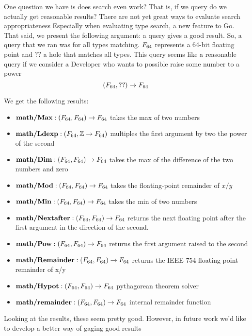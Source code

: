 One question we have is does search even work?
That is, if we query do we actually get reasonable results?
There are not yet great ways to evaluate search appropriateness
Especially when evaluating type search, a new feature to Go.
That said, we present the following argument:
a query gives a good result.
So, a query that we ran was for all types matching.
$F_{64}$ represents a 64-bit floating point and $??$
a hole that matches all types.
This query seems like a reasonable query if we consider a Developer who wants 
to possible raise some number to a power
$$(F_{64}, ??) \to F_{64}$$

We get the following results:
\begin{itemize}
    \item $\textbf{math/Max} : (F_{64}, F_{64}) \to F_{64}$ takes the max of two numbers  \\
    \item $\textbf{math/Ldexp} : (F_{64}, \mathbb{Z} \to F_{64})$ multiples the first argument by two the power of the second   \\
    \item $\textbf{math/Dim} : (F_{64}, F_{64}) \to F_{64}$ takes the max of the difference of the two numbers and zero  \\
    \item $\textbf{math/Mod} : (F_{64}, F_{64}) \to F_{64}$ takes the floating-point remainder of $x/y$ \\
    \item $\textbf{math/Min} : (F_{64}, F_{64}) \to F_{64}$ takes the min of two numbers  \\
    \item $\textbf{math/Nextafter} : (F_{64}, F_{64}) \to F_{64}$ returns the next floating point after the first argument in the direction of the second. \\
    \item $\textbf{math/Pow} : (F_{64}, F_{64}) \to F_{64}$ returns the first argument raised to the second  \\
    \item $\textbf{math/Remainder} : (F_{64}, F_{64}) \to F_{64}$ returns the IEEE 754 floating-point remainder of x/y \\
    \item $\textbf{math/Hypot} : (F_{64}, F_{64}) \to F_{64}$ pythagorean theorem solver \\
    \item $\textbf{math/remainder} : (F_{64}, F_{64}) \to F_{64}$ internal remainder function \\
\end{itemize}

Looking at the results, these seem pretty good.
However, in future work we'd like to develop a better way of gaging good results